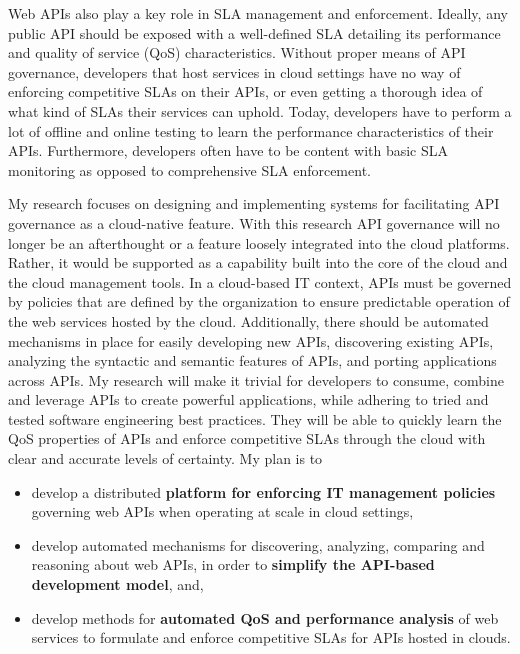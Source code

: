 Web APIs also play a key role in SLA
management and enforcement. Ideally, any public API should be exposed with a well-defined
SLA detailing its performance and quality of service (QoS) characteristics. Without proper means
of API governance, developers that host services in cloud settings have no way of enforcing
competitive SLAs on their APIs, or even getting a thorough idea of what kind of SLAs
their services can uphold. Today, developers have to perform a lot of offline
and online testing to learn the performance characteristics of their APIs.
Furthermore, developers often have to be content with basic SLA monitoring 
as opposed to comprehensive SLA enforcement. 

My research focuses on designing and implementing systems for facilitating 
API governance as a cloud-native feature. With this research API
governance will no longer be an afterthought or a feature loosely integrated
into the cloud platforms. Rather, it would be supported as a capability built into
the core of the cloud and the cloud management tools. 
In a cloud-based IT context, APIs must be governed by
policies that are defined by the organization to ensure predictable
operation of the web services hosted by the cloud. Additionally,
there should be automated mechanisms in place for easily developing new
APIs, discovering existing APIs, analyzing the syntactic and semantic features
of APIs, and porting applications across APIs. My research will make 
it trivial for developers to consume, combine and leverage APIs to create powerful
applications, while adhering to tried and tested software engineering 
best practices. They will be able to quickly learn
the QoS properties of APIs and enforce competitive SLAs through the cloud
with clear and accurate levels of certainty. My plan is to
\begin{itemize}
\item develop a distributed {\bf platform for enforcing IT 
management policies} governing
web APIs when operating at scale in cloud settings,
\item develop automated mechanisms for discovering, analyzing, comparing and reasoning
about web APIs, in order to {\bf simplify the API-based development model}, and,
\item develop methods for {\bf automated QoS and performance analysis} of web services
to formulate and enforce competitive SLAs for APIs hosted in clouds.
\end{itemize}

